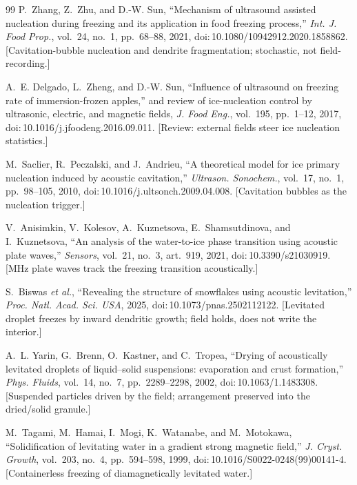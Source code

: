 \documentclass[11pt]{article}
\theoremstyle{definition}
\begin{document}
\begin{thebibliography}{99}
P.~Zhang, Z.~Zhu, and D.-W. Sun, ``Mechanism of ultrasound assisted nucleation during
freezing and its application in food freezing process,'' \emph{Int. J. Food Prop.}, vol.~24,
no.~1, pp.~68--88, 2021, doi:\,10.1080/10942912.2020.1858862. [Cavitation-bubble nucleation
and dendrite fragmentation; stochastic, not field-recording.]

A.~E. Delgado, L.~Zheng, and D.-W. Sun, ``Influence of ultrasound on freezing rate of
immersion-frozen apples,'' and review of ice-nucleation control by ultrasonic, electric, and
magnetic fields, \emph{J. Food Eng.}, vol.~195, pp.~1--12, 2017,
doi:\,10.1016/j.jfoodeng.2016.09.011. [Review: external fields steer ice nucleation
statistics.]

M.~Saclier, R.~Peczalski, and J.~Andrieu, ``A theoretical model for ice primary nucleation
induced by acoustic cavitation,'' \emph{Ultrason. Sonochem.}, vol.~17, no.~1, pp.~98--105,
2010, doi:\,10.1016/j.ultsonch.2009.04.008. [Cavitation bubbles as the nucleation trigger.]

V.~Anisimkin, V.~Kolesov, A.~Kuznetsova, E.~Shamsutdinova, and I.~Kuznetsova, ``An analysis
of the water-to-ice phase transition using acoustic plate waves,'' \emph{Sensors}, vol.~21,
no.~3, art.~919, 2021, doi:\,10.3390/s21030919. [MHz plate waves track the freezing
transition acoustically.]

S.~Biswas \emph{et al.}, ``Revealing the structure of snowflakes using acoustic levitation,''
\emph{Proc. Natl. Acad. Sci. USA}, 2025, doi:\,10.1073/pnas.2502112122. [Levitated droplet
freezes by inward dendritic growth; field holds, does not write the interior.]

A.~L. Yarin, G.~Brenn, O.~Kastner, and C.~Tropea, ``Drying of acoustically levitated droplets
of liquid--solid suspensions: evaporation and crust formation,'' \emph{Phys. Fluids},
vol.~14, no.~7, pp.~2289--2298, 2002, doi:\,10.1063/1.1483308. [Suspended particles driven by
the field; arrangement preserved into the dried/solid granule.]

M.~Tagami, M.~Hamai, I.~Mogi, K.~Watanabe, and M.~Motokawa, ``Solidification of levitating
water in a gradient strong magnetic field,'' \emph{J. Cryst. Growth}, vol.~203, no.~4,
pp.~594--598, 1999, doi:\,10.1016/S0022-0248(99)00141-4. [Containerless freezing of
diamagnetically levitated water.]


\end{thebibliography}
\end{document}
